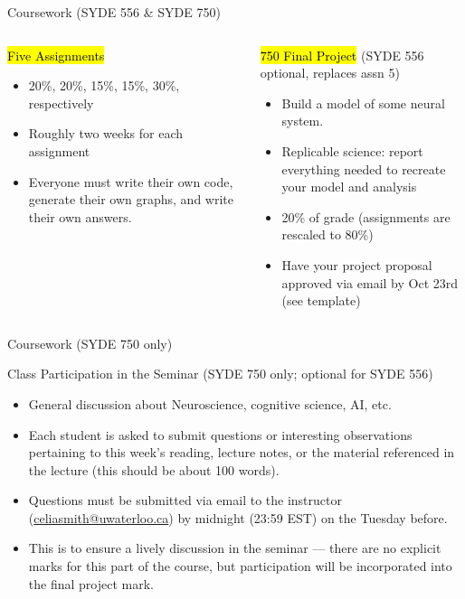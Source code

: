 \documentclass[aspectratio=169]{beamer}
\begin{document}
\begin{frame}{Coursework (SYDE 556 \& SYDE 750)}
	\begin{columns}[t]
		\begin{block}{\hl{Five Assignments}}
		\begin{itemize}
				\item 20\%, 20\%, 15\%, 15\%, 30\%, respectively
				\item Roughly two weeks for each assignment
				\item Everyone must write their own code, generate their own graphs, and write their own answers.
			\end{itemize}
		\end{block}
		\begin{block}{\hl{750 Final Project} (SYDE 556 optional, replaces assn 5)}
			\begin{itemize}
				\item Build a model of some neural system.
				\item Replicable science: report everything needed to recreate your model and analysis
				\item 20\% of grade (assignments are rescaled to 80\%)
				\item Have your project proposal approved via email by Oct 23rd (see template)
			\end{itemize}
		\end{block}
	\end{columns}
\end{frame}

\begin{frame}{Coursework (SYDE 750 only)}
	\begin{block}{Class Participation in the Seminar  (SYDE 750 only; optional for SYDE 556)}
	\begin{itemize}
		\item General discussion about Neuroscience, cognitive science, AI, etc.
		\item Each student is asked to submit questions or interesting observations pertaining to this week's reading, lecture notes, or the material referenced in the lecture (this should be about 100 words).
		\item Questions must be submitted via email to the instructor (\url{celiasmith@uwaterloo.ca}) by midnight (23:59 EST) on the Tuesday before.
    \item This is to ensure a lively discussion in the seminar --- there are no explicit marks for this part of the course, but participation will be incorporated into the final project mark.
  \end{itemize}
	\end{block}
\end{frame}
\end{document}
